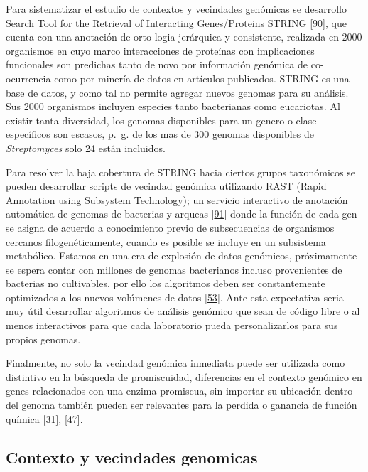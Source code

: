 \documentclass[12pt,twoside]{reedthesis}
\begin{document}
  Para sistematizar el estudio de contextos y vecindades genómicas se
  desarrollo Search Tool for the Retrieval of Interacting Genes/Proteins
  STRING {[}\protect\hyperlink{ref-snel_string_2000}{90}{]}, que cuenta
  con una anotación de orto logia jerárquica y consistente, realizada en
  2000 organismos en cuyo marco interacciones de proteínas con
  implicaciones funcionales son predichas tanto de novo por información
  genómica de co-ocurrencia como por minería de datos en artículos
  publicados. STRING es una base de datos, y como tal no permite agregar
  nuevos genomas para su análisis. Sus 2000 organismos incluyen especies
  tanto bacterianas como eucariotas. Al existir tanta diversidad, los
  genomas disponibles para un genero o clase específicos son escasos,
  p.~g. de los mas de 300 genomas disponibles de \emph{Streptomyces} solo
  24 están incluidos.
  
  Para resolver la baja cobertura de STRING hacia ciertos grupos
  taxonómicos se pueden desarrollar scripts de vecindad genómica
  utilizando RAST (Rapid Annotation using Subsystem Technology); un
  servicio interactivo de anotación automática de genomas de bacterias y
  arqueas {[}\protect\hyperlink{ref-aziz_rast_2008}{91}{]} donde la
  función de cada gen se asigna de acuerdo a conocimiento previo de
  subsecuencias de organismos cercanos filogenéticamente, cuando es
  posible se incluye en un subsistema metabólico. Estamos en una era de
  explosión de datos genómicos, próximamente se espera contar con millones
  de genomas bacterianos incluso provenientes de bacterias no cultivables,
  por ello los algoritmos deben ser constantemente optimizados a los
  nuevos volúmenes de datos
  {[}\protect\hyperlink{ref-medema_computational_2015}{53}{]}. Ante esta
  expectativa seria muy útil desarrollar algoritmos de análisis genómico
  que sean de código libre o al menos interactivos para que cada
  laboratorio pueda personalizarlos para sus propios genomas.
  
  Finalmente, no solo la vecindad genómica inmediata puede ser utilizada
  como distintivo en la búsqueda de promiscuidad, diferencias en el
  contexto genómico en genes relacionados con una enzima promiscua, sin
  importar su ubicación dentro del genoma también pueden ser relevantes
  para la perdida o ganancia de función química
  {[}\protect\hyperlink{ref-noda-garcia_evolution_2013}{31}{]},
  {[}\protect\hyperlink{ref-juarez-vazquez_evolution_2017}{47}{]}.
  
  \subsection{Contexto y vecindades
  genomicas}\label{contexto-y-vecindades-genomicas}
  
\end{document}
